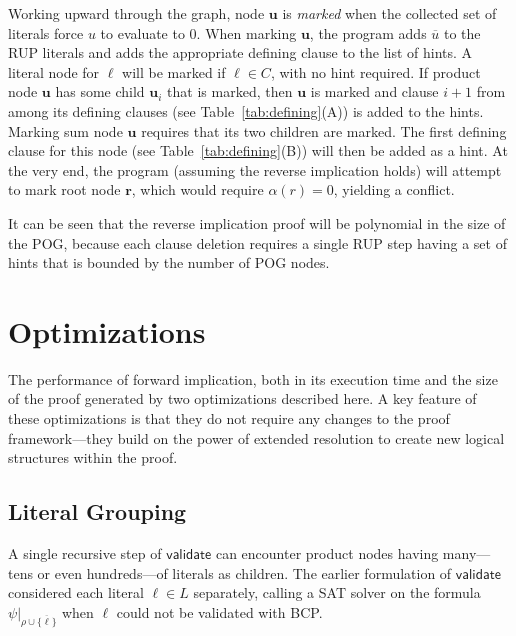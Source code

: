\documentclass[letterpaper,USenglish,cleveref, autoref, thm-restate]{lipics-v2021}
\newcommand{\obar}[1]{\overline{#1}}
\newcommand{\lit}{\ell}
\newcommand{\assign}{\alpha}
\newcommand{\passign}{\rho}
\newcommand{\validate}{\textsf{validate}}
\newcommand{\makenode}[1]{\mathbf{#1}}
\newcommand{\nodeu}{\makenode{u}}
\newcommand{\noder}{\makenode{r}}
\newcommand{\simplify}[2]{#1|_{#2}}
\begin{document}
Working upward through the graph, node $\nodeu$ is {\em marked} when
the collected set of literals force $u$ to evaluate to $0$.  When marking $\nodeu$, the
program adds $\obar{u}$ to the RUP literals and adds the appropriate
defining clause to the list of hints.  A literal node for
$\lit$ will be marked if $\lit \in C$, with no hint required.  If
product node $\nodeu$ has some child $\nodeu_i$ that is marked, then
$\nodeu$ is marked and clause $i+1$ from among its defining clauses (see Table~\ref{tab:defining}(A)) is
added to the hints.  Marking sum node $\nodeu$ requires that its two children are marked.
The first defining
clause for this node (see Table~\ref{tab:defining}(B)) will then be added as a hint.  At the very end, the program
(assuming the reverse implication holds) will attempt to mark root
node $\noder$, which would require $\assign(r) = 0$, yielding a
conflict.

It can be seen that the reverse implication proof will be polynomial in the size of the POG\@, because
each clause deletion requires a single RUP step having a set of hints that is
bounded by the number of POG nodes.

\section{Optimizations}

The performance of forward implication, both in its execution time and
the size of the proof generated by two optimizations described here.
A key feature of these optimizations is that they do not require any changes to the
proof framework---they build on the power of extended resolution to
create new logical structures within the proof.

\subsection{Literal Grouping}

A single recursive step of $\validate$ can encounter product nodes
having many---tens or even hundreds---of literals as children.  The earlier formulation of $\validate$
considered each literal $\lit \in L$ separately,
calling a SAT solver
on the formula  $\simplify{\psi}{\passign \cup \{\obar{\lit}\}}$ when $\lit$ could not be validated with BCP\@.
\end{document}
